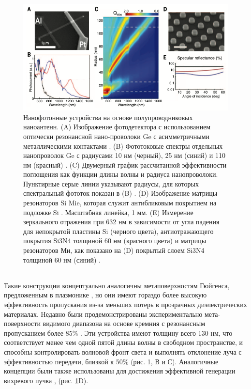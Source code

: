  \begin{figure}[h!]
	\centering
	\includegraphics[width=0.6\linewidth]{images/fig5.png}
	\caption{ Нанофотонные устройства на основе полупроводниковых наноантенн. (A) Изображение фотодетектора с использованием оптически резонансной нано-проволоки Ge с асимметричными металлическими контактами \cite{delMetRefctPolar}. (B) Фототоковые спектры отдельных нанопроволок Ge с радиусами 10 нм (черный), 25 нм (синий) и 110 нм (красный) \cite{delMetRefctPolar}. (C) Двумерный график рассчитанной эффективности поглощения как функции длины волны и радиуса нанопроволоки. Пунктирные серые линии указывают радиусы, для которых спектральный фототок показан в (B) \cite{delMetRefctPolar}. (D) Изображение матрицы резонаторов Si Mie, которая служит антибликовым покрытием на подложке Si \cite{broadAntSubMie}. Масштабная линейка, 1 мм. (E) Измерение зеркального отражения при 632 нм в зависимости от угла падения для непокрытой пластины Si (черного цвета), антиотражающего покрытия Si3N4 толщиной 60 нм (красного цвета) и матрицы резонаторов Ми, как показано на (D) покрытый слоем Si3N4 толщиной 60 нм (синий) \cite{broadAntSubMie}. }
	\label{nonliner:matasurf1}
\end{figure}
\\
\hspace*{2mm}
Такие конструкции концептуально аналогичны метаповерхностям Гюйгенса, предложенным в плазмонике \cite{effLightNetaSurf}, но они имеют гораздо более высокую эффективность пропускания из-за меньших потерь в прозрачных диэлектрических материалах. Недавно были продемонстрированы экспериментально мета-поверхности видимого диапазона на основе кремния с резонансным пропусканием более 85\% \cite{higTranMetasurf}. Эти устройства имеют толщину всего 130 нм, что соответствует менее чем одной пятой длины волны в свободном пространстве, и способны контролировать волновой фронт света и выполнять отклонение луча с эффективностью передачи, близкой к 50\% (рис. \ref{nonliner:matasurf1}, В и С). Аналогичные концепции были также использованы для достижения эффективной генерации вихревого пучка \cite{polIndtSiDev}, \cite{delMetRefctPolar} (рис. \ref{nonliner:matasurf1}D). 
